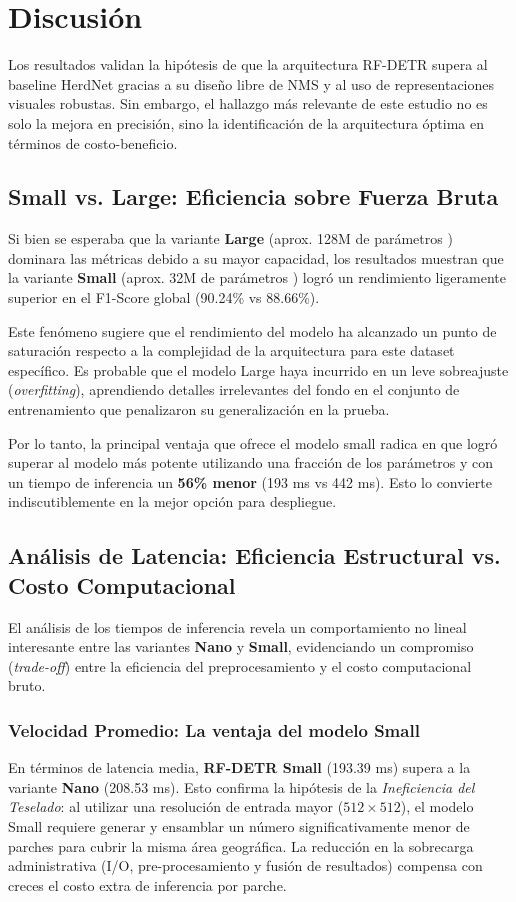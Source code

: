 \section{Discusión}

Los resultados validan la hipótesis de que la arquitectura RF-DETR supera al baseline HerdNet gracias a su diseño libre de NMS y al uso de representaciones visuales robustas. Sin embargo, el hallazgo más relevante de este estudio no es solo la mejora en precisión, sino la identificación de la arquitectura óptima en términos de costo-beneficio.

\subsection{Small vs. Large: Eficiencia sobre Fuerza Bruta}

Si bien se esperaba que la variante \textbf{Large} (aprox. 128M de parámetros ) dominara las métricas debido a su mayor capacidad, los resultados muestran que la variante \textbf{Small} (aprox. 32M de parámetros ) logró un rendimiento ligeramente superior en el F1-Score global (90.24\% vs 88.66\%).

Este fenómeno sugiere que el rendimiento del modelo ha alcanzado un punto de saturación respecto a la complejidad de la arquitectura para este dataset específico. Es probable que el modelo Large haya incurrido en un leve sobreajuste (\textit{overfitting}), aprendiendo detalles irrelevantes del fondo en el conjunto de entrenamiento que penalizaron su generalización en la prueba.

Por lo tanto, la principal ventaja que ofrece el modelo small radica en que logró superar al modelo más potente utilizando una fracción de los parámetros y con un tiempo de inferencia un \textbf{56\% menor} (193 ms vs 442 ms). Esto lo convierte indiscutiblemente en la mejor opción para despliegue.

\subsection{Análisis de Latencia: Eficiencia Estructural vs. Costo Computacional}

El análisis de los tiempos de inferencia revela un comportamiento no lineal interesante entre las variantes \textbf{Nano} y \textbf{Small}, evidenciando un compromiso (\textit{trade-off}) entre la eficiencia del preprocesamiento y el costo computacional bruto.

\subsubsection{Velocidad Promedio: La ventaja del modelo Small}
En términos de latencia media, \textbf{RF-DETR Small} (193.39 ms) supera a la variante \textbf{Nano} (208.53 ms). Esto confirma la hipótesis de la \textit{Ineficiencia del Teselado}: al utilizar una resolución de entrada mayor ($512 \times 512$), el modelo Small requiere generar y ensamblar un número significativamente menor de parches para cubrir la misma área geográfica. La reducción en la sobrecarga administrativa (I/O, pre-procesamiento y fusión de resultados) compensa con creces el costo extra de inferencia por parche.

